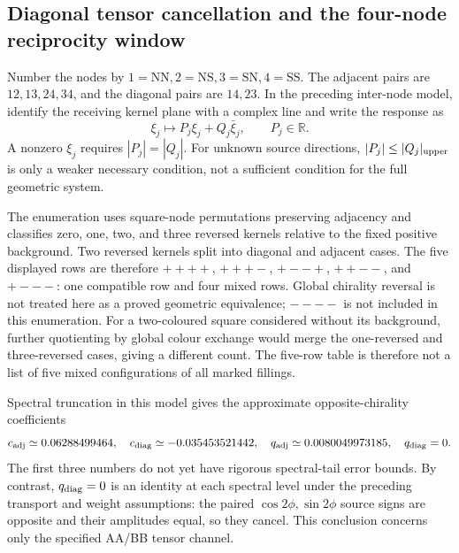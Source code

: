 \documentclass[a4paper,11pt]{article}
\numberwithin{equation}{section}
\theoremstyle{definition}
\newcommand{\R}{\mathbb R}
\begin{document}
\subsection{Diagonal tensor cancellation and the four-node reciprocity window}\label{sec:four-node-reciprocity}
Number the nodes by $1=\mathrm{NN},2=\mathrm{NS},3=\mathrm{SN},4=\mathrm{SS}$. The adjacent pairs are $12,13,24,34$, and the diagonal pairs are $14,23$. In the preceding inter-node model, identify the receiving kernel plane with a complex line and write the response as
\[
\xi_j\longmapsto P_j\xi_j+Q_j\bar\xi_j,
\qquad P_j\in\R.
\]
A nonzero $\xi_j$ requires $|P_j|=|Q_j|$. For unknown source directions, $|P_j|\le |Q_j|_{\rm upper}$ is only a weaker necessary condition, not a sufficient condition for the full geometric system.

The enumeration uses square-node permutations preserving adjacency and classifies zero, one, two, and three reversed kernels relative to the fixed positive background.
Two reversed kernels split into diagonal and adjacent cases. The five displayed rows are therefore
$++++$, $+++-$, $+--+$, $++--$, and $+---$: one compatible row and four mixed rows.
Global chirality reversal is not treated here as a proved geometric equivalence; $----$ is not included in this enumeration.
For a two-coloured square considered without its background, further quotienting by global colour exchange would merge the one-reversed and three-reversed cases,
giving a different count. The five-row table is therefore not a list of five mixed configurations of all marked fillings.

Spectral truncation in this model gives the approximate opposite-chirality coefficients
\[
c_{\rm adj}\simeq0.06288499464,\quad
c_{\rm diag}\simeq-0.035453521442,\quad
q_{\rm adj}\simeq0.0080049973185,\quad q_{\rm diag}=0.
\]
The first three numbers do not yet have rigorous spectral-tail error bounds. By contrast, $q_{\rm diag}=0$ is an identity at each spectral level under the preceding transport and weight assumptions: the paired $\cos2\phi,\sin2\phi$ source signs are opposite and their amplitudes equal, so they cancel. This conclusion concerns only the specified AA/BB tensor channel.
\end{document}
